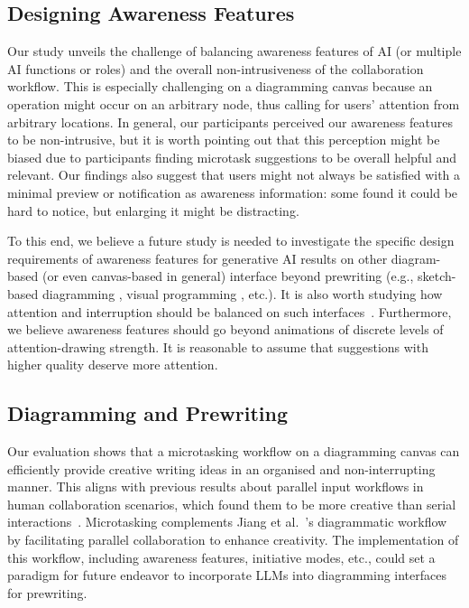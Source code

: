 \subsection{Designing Awareness Features} \label{designing-awareness-features}
Our study unveils the challenge of balancing awareness features of AI (or multiple AI functions or roles) and the overall non-intrusiveness of the collaboration workflow. This is especially challenging on a diagramming canvas because an operation might occur on an arbitrary node, thus calling for users' attention from arbitrary locations. In general, our participants perceived our awareness features to be non-intrusive, but it is worth pointing out that this perception might be biased due to participants finding microtask suggestions to be overall helpful and relevant. Our findings also suggest that users might not always be satisfied with a minimal preview or notification as awareness information:
some found it could be hard to notice, but enlarging it might be distracting.

To this end, we believe a future study is needed to investigate the specific design requirements of awareness features for generative AI results on other diagram-based (or even canvas-based in general) interface beyond prewriting (e.g., sketch-based diagramming \cite{zeleznik2008lineogrammer,kara2004hierarchical}, visual programming \cite{li2020supporting}, etc.). It is also worth studying how attention and interruption should be balanced on such interfaces~\cite{gluck2007matching}. Furthermore, we believe awareness features should go beyond animations of discrete levels of attention-drawing strength. It is reasonable to assume that suggestions with higher quality deserve more attention.

\subsection{Diagramming and Prewriting}
Our evaluation shows that a microtasking workflow on a diagramming canvas can efficiently provide creative writing ideas in an organised and non-interrupting manner. This aligns with previous results about parallel input workflows in human collaboration scenarios, which found them to be more creative than serial interactions~\cite{shih2009groupmind,hymes1992unblocking}. Microtasking complements Jiang et al.~\cite{jiang2023graphologue}'s diagrammatic workflow by facilitating parallel collaboration to enhance creativity. The implementation of this workflow, including awareness features, initiative modes, etc., could set a paradigm for future endeavor to incorporate LLMs into diagramming interfaces for prewriting.

